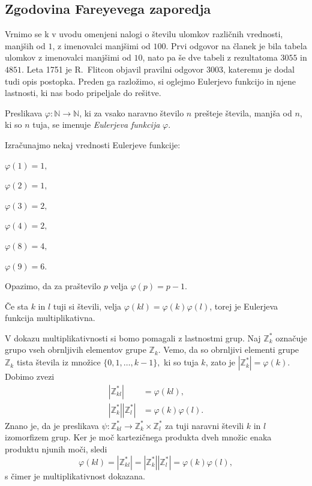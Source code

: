 \documentclass[mat1]{fmfdelo}
\begin{document}
%
\subsection{Zgodovina Fareyevega zaporedja}

Vrnimo se k v uvodu omenjeni nalogi o številu ulomkov različnih vrednosti, manjših od $1$, z imenovalci manjšimi od $100$. Prvi odgovor na članek je bila tabela ulomkov z imenovalci manjšimi od $10$, nato pa še dve tabeli z rezultatoma $3055$ in $4851$. Leta 1751 je R.~Flitcon objavil pravilni odgovor $3003$, kateremu je dodal tudi opis postopka. Preden ga razložimo, si oglejmo Eulerjevo funkcijo in njene lastnosti, ki nas bodo pripeljale do rešitve. 
%

\begin{definicija}
Preslikava \( \varphi \colon \mathbb{N} \rightarrow \mathbb{N}\), ki za vsako naravno število $n$ prešteje števila, manjša od $n$, ki so $n$ tuja, se imenuje \emph{Eulerjeva funkcija} $\varphi$.
\end{definicija}

\begin{primer}
Izračunajmo nekaj vrednosti Eulerjeve funkcije:

\( \varphi(1) = 1, \)

\( \varphi(2) = 1, \)

\( \varphi(3) = 2, \)

\( \varphi(4) = 2, \)

\( \varphi(8) = 4, \)

\( \varphi(9) = 6. \)

Opazimo, da za praštevilo $p$ velja $\varphi(p) = p-1.$
\end{primer}

\begin{trditev}
\label{trd:MultipEuler}
Če sta $k$ in $l$ tuji si števili, velja $\varphi (kl) = \varphi (k) \varphi (l)$, torej je Eulerjeva funkcija multiplikativna.
\end{trditev}

\begin{dokaz}
V dokazu multiplikativnosti si bomo pomagali z lastnostmi grup. 
Naj $\mathbb{Z}_{k}^\ast $ označuje grupo vseh obrnljivih elementov grupe $\mathbb{Z}_{k}$. Vemo, da so obrnljivi elementi grupe $\mathbb{Z}_{k}$ tista števila iz množice \( \{0, 1, \ldots, k-1 \}, \) ki so tuja $k$, zato je $|\mathbb{Z}_{k}^\ast| = \varphi(k).$  
Dobimo zvezi
\begin{align*}
|\mathbb{Z}_{kl}^\ast| &= \varphi(kl), \\
|\mathbb{Z}_{k}^\ast| |\mathbb{Z}_{l}^\ast| &= \varphi(k) \varphi(l).
\end{align*}
Znano je, da je preslikava \( \psi \colon \mathbb{Z}_{kl}^\ast \rightarrow \mathbb{Z}_{k}^\ast \times \mathbb{Z}_{l}^\ast \) za tuji naravni števili $k$ in $l$ izomorfizem grup. Ker je moč kartezičnega produkta dveh množic enaka produktu njunih moči, sledi 
\[ \varphi(kl) = |\mathbb{Z}_{kl}^\ast| = |\mathbb{Z}_{k}^\ast| |\mathbb{Z}_{l}^\ast| = \varphi(k) \varphi(l), \]
s čimer je multiplikativnost dokazana.
\end{dokaz}
\end{document}
